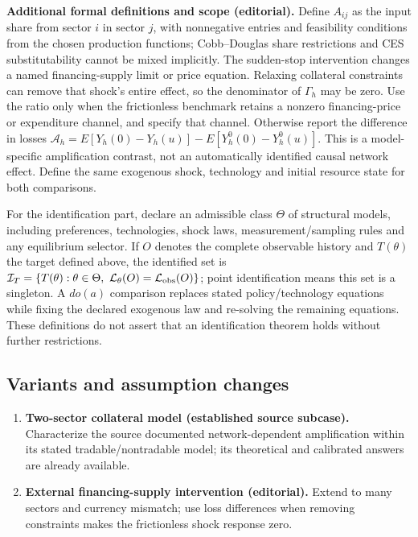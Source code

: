 \documentclass[11pt,a4paper]{article}
\begin{document}
\textbf{Additional formal definitions and scope (editorial).} Define \(A_{ij}\) as the input share from sector \(i\) in sector \(j\), with nonnegative entries and feasibility conditions from the chosen production functions; Cobb--Douglas share restrictions and CES substitutability cannot be mixed implicitly. The sudden-stop intervention changes a named financing-supply limit or price equation. Relaxing collateral constraints can remove that shock's entire effect, so the denominator of \(\Gamma_h\) may be zero. Use the ratio only when the frictionless benchmark retains a nonzero financing-price or expenditure channel, and specify that channel. Otherwise report the difference in losses \(\mathcal A_h=E[Y_h(0)-Y_h(u)]-E[Y_h^0(0)-Y_h^0(u)]\). This is a model-specific amplification contrast, not an automatically identified causal network effect. Define the same exogenous shock, technology and initial resource state for both comparisons.

For the identification part, declare an admissible class \(\Theta\) of structural models, including preferences, technologies, shock laws, measurement/sampling rules and any equilibrium selector. If \(O\) denotes the complete observable history and \(T(\theta)\) the target defined above, the identified set is \(\mathcal I_T=\{T(\theta):\theta\in\Theta,\ \mathcal L_\theta(O)=\mathcal L_{\rm obs}(O)\}\); point identification means this set is a singleton. A \(do(a)\) comparison replaces stated policy/technology equations while fixing the declared exogenous law and re-solving the remaining equations. These definitions do not assert that an identification theorem holds without further restrictions.
\subsection*{Variants and assumption changes}
\begin{enumerate}
\item \textbf{Two-sector collateral model (established source subcase).} Characterize the source documented network-dependent amplification within its stated tradable/nontradable model; its theoretical and calibrated answers are already available.
\item \textbf{External financing-supply intervention (editorial).} Extend to many sectors and currency mismatch; use loss differences when removing constraints makes the frictionless shock response zero.
\end{enumerate}
\end{document}
